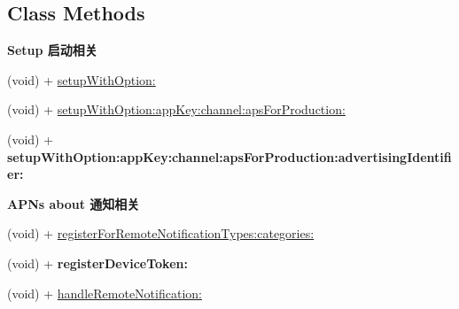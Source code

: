 \subsection*{Class Methods}
\begin{Indent}\textbf{ Setup 启动相关}\par
{\em 

 

 }\begin{DoxyCompactItemize}
\item 
(void) + \mbox{\hyperlink{interface_j_p_u_s_h_service_a2266fd57b52be8614de9da9673bb24d8}{setup\+With\+Option\+:}}
\item 
(void) + \mbox{\hyperlink{interface_j_p_u_s_h_service_a8c68e03465a687861b8a2e680a433881}{setup\+With\+Option\+:app\+Key\+:channel\+:aps\+For\+Production\+:}}
\item 
\mbox{\label{interface_j_p_u_s_h_service_aa4df1125dce69d55ef9a2279624e9805}} 
(void) + {\bfseries setup\+With\+Option\+:app\+Key\+:channel\+:aps\+For\+Production\+:advertising\+Identifier\+:}
\end{DoxyCompactItemize}
\end{Indent}
\begin{Indent}\textbf{ A\+P\+Ns about 通知相关}\par
{\em 

 

 }\begin{DoxyCompactItemize}
\item 
(void) + \mbox{\hyperlink{interface_j_p_u_s_h_service_a99d9c562921d4809b9691bf668146f91}{register\+For\+Remote\+Notification\+Types\+:categories\+:}}
\item 
\mbox{\label{interface_j_p_u_s_h_service_a6ef8667fd7cdb21e4287d580115afb37}} 
(void) + {\bfseries register\+Device\+Token\+:}
\item 
(void) + \mbox{\hyperlink{interface_j_p_u_s_h_service_a287e834670c83a68e1e3423bf9880125}{handle\+Remote\+Notification\+:}}
\end{DoxyCompactItemize}
\end{Indent}
